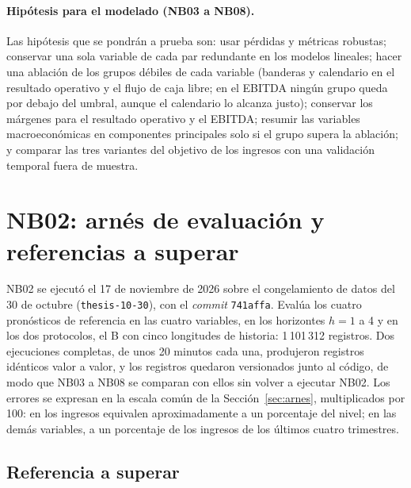 \documentclass[12pt,letterpaper,oneside]{report}
\renewcommand{\_}{\UnderscoreOriginal\allowbreak}
\begin{document}
\paragraph{Hipótesis para el modelado (NB03 a NB08).} Las hipótesis que se pondrán a prueba son: usar pérdidas y métricas robustas; conservar una sola variable de cada par redundante en los modelos lineales; hacer una ablación de los grupos débiles de cada variable (banderas y calendario en el resultado operativo y el flujo de caja libre; en el EBITDA ningún grupo queda por debajo del umbral, aunque el calendario lo alcanza justo); conservar los márgenes para el resultado operativo y el EBITDA; resumir las variables macroeconómicas en componentes principales solo si el grupo supera la ablación; y comparar las tres variantes del objetivo de los ingresos con una validación temporal fuera de muestra.

\section{NB02: arnés de evaluación y referencias a superar}
\label{sec:res-nb02}

NB02 se ejecutó el 17 de noviembre de 2026 sobre el congelamiento de datos del 30 de octubre (\texttt{thesis\_2026-10-30}), con el \textit{commit} \texttt{741affa}. Evalúa los cuatro pronósticos de referencia en las cuatro variables, en los horizontes $h = 1$ a 4 y en los dos protocolos, el B con cinco longitudes de historia: 1\,101\,312 registros. Dos ejecuciones completas, de unos 20 minutos cada una, produjeron registros idénticos valor a valor, y los registros quedaron versionados junto al código, de modo que NB03 a NB08 se comparan con ellos sin volver a ejecutar NB02. Los errores se expresan en la escala común de la Sección~\ref{sec:arnes}, multiplicados por 100: en los ingresos equivalen aproximadamente a un porcentaje del nivel; en las demás variables, a un porcentaje de los ingresos de los últimos cuatro trimestres.

\subsection{Referencia a superar}
\end{document}
